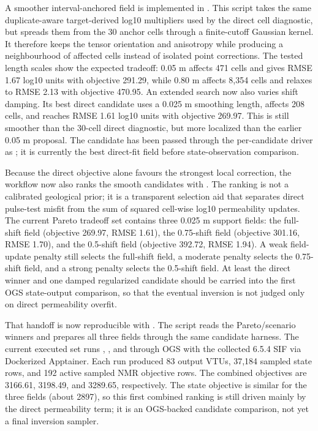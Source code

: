 A smoother interval-anchored field is implemented in
.  This script takes the same
duplicate-aware target-derived log10 multipliers used by the direct cell diagnostic,
but spreads them from the 30 anchor cells through a finite-cutoff Gaussian kernel.  It
therefore keeps the tensor orientation and anisotropy while producing a neighbourhood
of affected cells instead of isolated point corrections.  The tested length scales
show the expected tradeoff: 0.05 m affects 471 cells and gives RMSE 1.67 log10 units
with objective 291.29, while 0.80 m affects 8,354 cells and relaxes to RMSE 2.13 with
objective 470.95.  An extended search now also varies shift damping.  Its best direct
candidate uses a 0.025 m smoothing length, affects 208 cells, and reaches RMSE 1.61
log10 units with objective 269.97.  This is still smoother than the 30-cell direct
diagnostic, but more localized than the earlier 0.05 m proposal.  The candidate has
been passed through the per-candidate driver as
; it is currently the best direct-fit
field before state-observation comparison.

Because the direct objective alone favours the strongest local correction, the
workflow now also ranks the smooth candidates with
.  The ranking is not a calibrated
geological prior; it is a transparent selection aid that separates direct pulse-test
misfit from the sum of squared cell-wise log10 permeability updates.  The current
Pareto tradeoff set contains three 0.025 m support fields: the full-shift
 field (objective 269.97, RMSE 1.61), the 0.75-shift field
(objective 301.16, RMSE 1.70), and the 0.5-shift field (objective 392.72, RMSE
1.94).  A weak field-update penalty still selects the full-shift field, a moderate
penalty selects the 0.75-shift field, and a strong penalty selects the 0.5-shift
field.  At least the direct winner and one damped regularized candidate should be
carried into the first OGS state-output comparison, so that the eventual inversion is
not judged only on direct permeability overfit.

That handoff is now reproducible with
.  The script reads the Pareto/scenario
winners and prepares all three fields through the same candidate harness.  The
current executed set runs ,
, and  through OGS
with the collected 6.5.4 SIF via Dockerized Apptainer.  Each run produced 83 output
VTUs, 37,184 sampled state rows, and 192 active sampled NMR objective rows.  The
combined objectives are 3166.61, 3198.49, and 3289.65, respectively.  The state
objective is similar for the three fields (about 2897), so this first combined
ranking is still driven mainly by the direct permeability term; it is an OGS-backed
candidate comparison, not yet a final inversion sampler.

